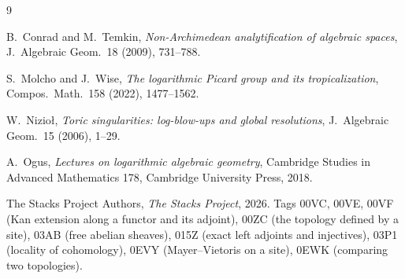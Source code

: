 \documentclass[12pt]{article}
\theoremstyle{definition}
\theoremstyle{remark}
\begin{document}
\begin{thebibliography}{9}

B.~Conrad and M.~Temkin,
\emph{Non-Archimedean analytification of algebraic spaces},
J.~Algebraic Geom.\ 18 (2009), 731--788.

S.~Molcho and J.~Wise,
\emph{The logarithmic Picard group and its tropicalization},
Compos.\ Math.\ 158 (2022), 1477--1562.

W.~Nizio{\l},
\emph{Toric singularities: log-blow-ups and global resolutions},
J.~Algebraic Geom.\ 15 (2006), 1--29.

A.~Ogus,
\emph{Lectures on logarithmic algebraic geometry},
Cambridge Studies in Advanced Mathematics 178,
Cambridge University Press, 2018.

The Stacks Project Authors,
\emph{The Stacks Project}, 2026.
Tags 00VC, 00VE, 00VF (Kan extension along a functor and its adjoint),
00ZC (the topology defined by a site),
03AB (free abelian sheaves),
015Z (exact left adjoints and injectives),
03P1 (locality of cohomology),
0EVY (Mayer--Vietoris on a site),
0EWK (comparing two topologies).

\end{thebibliography}
\end{document}
